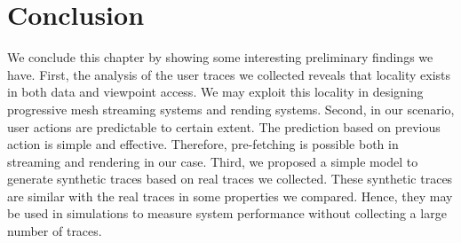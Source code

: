 \section{Conclusion}
We conclude this chapter by showing some interesting preliminary findings we have.
First, the analysis of the user traces we collected reveals that locality exists in both data and viewpoint access. 
We may exploit this locality in designing progressive mesh streaming systems and rending systems.
Second, in our scenario, user actions are predictable to certain extent. 
The prediction based on previous action is simple and effective. 
Therefore, pre-fetching is possible both in streaming and rendering in our case.
Third, we proposed a simple model to generate synthetic traces based on real traces we collected. 
These synthetic traces are similar with the real traces in some properties we compared.
Hence, they may be used in simulations to measure system performance without collecting
a large number of traces.



